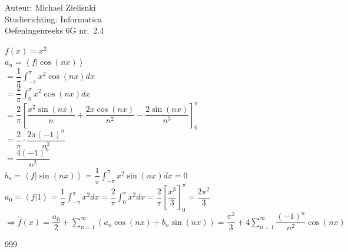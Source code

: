 \documentclass[a4paper]{article}
\begin{document}
  
\noindent \large Auteur: Michael Zielisnki\\
\noindent \large Studierichting: Informatica\\
\noindent \large Oefeningenreeks 6G nr.\ 2.4\\

\medskip

\normalsize

$ f(x) = x^2 $\\

$ a_n = \left< f | \cos(nx) \right>$\\

$= \dfrac{1}{\pi}\displaystyle\int_{-\pi}^{\pi}x^2\cos(nx)dx$\\

$= \dfrac{2}{\pi}\displaystyle\int_{0}^{\pi}x^2\cos(nx)dx$\\

$= \dfrac{2}{\pi}\left[ \dfrac{x^2\sin(nx)}{n} + \dfrac{2x\cos(nx)}{n^2} - \dfrac{2\sin(nx)}{n^3} \right]_0^\pi$\\

$= \dfrac{2}{\pi}\cdot\dfrac{2\pi(-1)^n}{n^2}$\\

$= \dfrac{4(-1)^n}{n^2} $\\

$ b_n = \left< f | \sin(nx) \right>
  = \dfrac{1}{\pi}\displaystyle\int_{-\pi}^{\pi}x^2\sin(nx)dx
  = 0 $\\

$ a_0 = \left< f | 1 \right>
  = \dfrac{1}{\pi}\displaystyle\int_{-\pi}^{\pi}x^2dx
  = \dfrac{2}{\pi}\displaystyle\int_{0}^{\pi}x^2dx
  = \dfrac{2}{\pi}\left[ \dfrac{x^3}{3} \right]_0^\pi
  = \dfrac{2\pi^2}{3} $\\

$ \Rightarrow \widehat{f}(x)
  = \dfrac{a_0}{2}
  + \sum\limits_{n=1}^{\infty}\left(a_n\cos(nx)+b_n\sin(nx)\right)
  = \dfrac{\pi^2}{3}
  + 4\sum\limits_{n=1}^{\infty}\dfrac{(-1)^n}{n^2}\cos(nx) $\\

\begin{thebibliography}{999}
\end{thebibliography}
\end{document}
